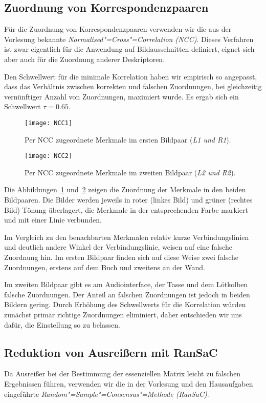 \subsection{Zuordnung von Korrespondenzpaaren}
Für die Zuordnung von Korrespondenzpaaren verwenden wir die aus der Vorlesung bekannte \textit{Normalised"=Cross"=Correlation (NCC)}. Dieses Verfahren ist zwar eigentlich für die Anwendung auf Bildausschnitten definiert, eignet sich aber auch für die Zuordnung anderer Deskriptoren.

Den Schwellwert für die minimale Korrelation haben wir empirisch so angepasst, dass das Verhältnis zwischen korrekten und falschen Zuordnungen, bei gleichzeitig vernünftiger Anzahl von Zuordnungen, maximiert wurde. Es ergab sich ein Schwellwert $\tau = 0.65$.

\begin{figure}[!hp]
	\centering
	\texttt{[image: NCC1]}
	\caption{Per NCC zugeordnete Merkmale im ersten Bildpaar (\textit{L1 und R1}).}
	\label{fig:ncc1}
\end{figure}

\begin{figure}[!hp]
	\centering
	\texttt{[image: NCC2]}
	\caption{Per NCC zugeordnete Merkmale im zweiten Bildpaar (\textit{L2 und R2}).}
	\label{fig:ncc2}
\end{figure}

Die Abbildungen~\ref{fig:ncc1} und~\ref{fig:ncc2} zeigen die Zuordnung der Merkmale in den beiden Bildpaaren. Die Bilder werden jeweils in roter (linkes Bild) und grüner (rechtes Bild) Tönung überlagert, die Merkmale in der entsprechenden Farbe markiert und mit einer Linie verbunden.

Im Vergleich zu den benachbarten Merkmalen relativ kurze Verbindungslinien und deutlich andere Winkel der Verbindungslinie, weisen auf eine falsche Zuordnung hin. Im ersten Bildpaar finden sich auf diese Weise zwei falsche Zuordnungen, erstens auf dem Buch und zweitens an der Wand.

Im zweiten Bildpaar gibt es am Audiointerface, der Tasse und dem Lötkolben falsche Zuordnungen. Der Anteil an falschen Zuordnungen ist jedoch in beiden Bildern gering. Durch Erhöhung des Schwellwerts für die Korrelation würden zunächst primär richtige Zuordnungen eliminiert, daher entschieden wir uns dafür, die Einstellung so zu belassen.

\subsection{Reduktion von Ausreißern mit RanSaC}
\label{ssec:ransac}
Da Ausreißer bei der Bestimmung der essenziellen Matrix leicht zu falschen Ergebnissen führen, verwenden wir die in der Vorlesung und den Hausaufgaben eingeführte \textit{Random"=Sample"=Consensus"=Methode (RanSaC)}.

